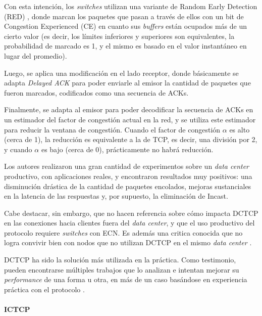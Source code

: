 \documentclass[runningheads,a4paper]{llncs}
\begin{document}
Con esta intención, los \textit{switches} utilizan una variante de Random Early Detection (RED) \cite{Floyd_RED_1993}, donde marcan los paquetes que pasan a través de ellos con un bit de Congestion Experienced (CE) en cuanto sus \textit{buffers} están ocupados más de un cierto valor (es decir, los límites inferiores y superiores son equivalentes, la probabilidad de marcado es 1, y el mismo es basado en el valor instantáneo en lugar del promedio).

Luego, se aplica una modificación en el lado receptor, donde básicamente se adapta \textit{Delayed ACK} para poder enviarle al emisor la cantidad de paquetes que fueron marcados, codificados como una secuencia de ACKs.

Finalmente, se adapta al emisor para poder decodificar la secuencia de ACKs en un estimador del factor de congestión actual en la red, y se utiliza este estimador para reducir la ventana de congestión. Cuando el factor de congestión $\alpha$ es alto (cerca de 1), la reducción es equivalente a la de TCP, es decir, una división por 2, y cuando $\alpha$ es bajo (cerca de 0), prácticamente no habrá reducción.

Los autores realizaron una gran cantidad de experimentos sobre un \textit{data center} productivo, con aplicaciones reales, y encontraron resultados muy positivos: una disminución drástica de la cantidad de paquetes encolados, mejoras sustanciales en la latencia de las respuestas y, por supuesto, la eliminación de Incast.

Cabe destacar, sin embargo, que no hacen referencia sobre cómo impacta DCTCP en las conexiones hacia clientes fuera del \textit{data center}, y que el uso productivo del protocolo requiere \textit{switches} con ECN. Es además una critica conocida que no logra convivir bien con nodos que no utilizan DCTCP en el mismo \textit{data center} \cite{Judd_Promise_2015}.

DCTCP ha sido la solución más utilizada en la práctica. Como testimonio, pueden encontrarse múltiples trabajos que lo analizan e intentan mejorar su \textit{performance} de una forma u otra, en más de un caso basándose en experiencia práctica con el protocolo \cite{Alizadeh_DCTCP_Analysis_2011} \cite{Vamanan_D2TCP_2012} \cite{Munir_L2DCT_2013} \cite{Judd_Promise_2015} \cite{Sreekumari_NewDCTCP_2016}.

\paragraph{ICTCP}
\end{document}
